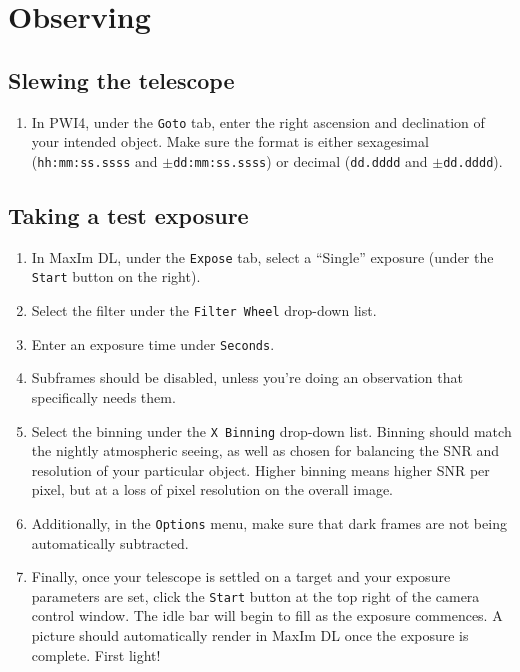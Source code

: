 \documentclass{article}
\begin{document}
	\newpage
	\section{Observing}

	\subsection{Slewing the telescope}

		\begin{enumerate}

			\item In PWI4, under the \texttt{Goto} tab, enter the right ascension and declination of your intended object. Make sure the format is either sexagesimal (\texttt{hh:mm:ss.ssss} and \texttt{$\pm$dd:mm:ss.ssss}) or decimal (\texttt{dd.dddd} and \texttt{$\pm$dd.dddd}).

		\end{enumerate}

	\subsection{Taking a test exposure}

		\begin{enumerate}

			\item In MaxIm DL, under the \texttt{Expose} tab, select a ``Single'' exposure (under the \texttt{Start} button on the right).

			\item Select the filter under the \texttt{Filter Wheel} drop-down list.

			\item Enter an exposure time under \texttt{Seconds}.

			\item Subframes should be disabled, unless you're doing an observation that specifically needs them.

			\item Select the binning under the \texttt{X Binning} drop-down list. Binning should match the nightly atmospheric seeing, as well as chosen for balancing the SNR and resolution of your particular object. Higher binning means higher SNR per pixel, but at a loss of pixel resolution on the overall image.

			\item Additionally, in the \texttt{Options} menu, make sure that dark frames are not being automatically subtracted.

			\item Finally, once your telescope is settled on a target and your exposure parameters are set, click the \texttt{Start} button at the top right of the camera control window. The idle bar will begin to fill as the exposure commences. A picture should automatically render in MaxIm DL once the exposure is complete. First light!

		\end{enumerate}
\end{document}
